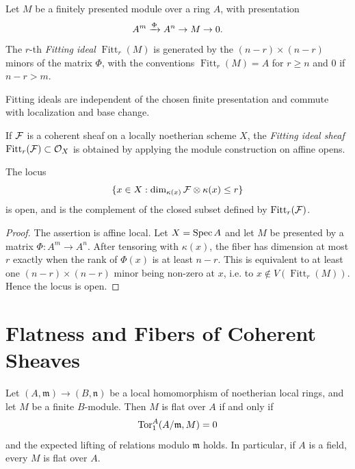 \begin{definition}
Let \(M\) be a finitely presented module over a ring \(A\), with presentation
\[
    A^m\xrightarrow{\Phi} A^n\to M\to0.
\]
The \(r\)-th \emph{Fitting ideal} \(\operatorname{Fitt}_r(M)\) is generated by
the \((n-r)\times(n-r)\) minors of the matrix \(\Phi\), with the conventions
\(\operatorname{Fitt}_r(M)=A\) for \(r\ge n\) and \(0\) if \(n-r>m\).
\end{definition}

\begin{fact}
Fitting ideals are independent of the chosen finite presentation and commute
with localization and base change.
\end{fact}

\begin{definition}
If \(\mathcal{F}\) is a coherent sheaf on a locally noetherian scheme \(X\), the
\emph{Fitting ideal sheaf} \(\operatorname{Fitt}_r(\mathcal{F})\subset\mathcal{O}_X\) is
obtained by applying the module construction on affine opens.
\end{definition}

\begin{proposition}
The locus
\[
    \{x\in X:\dim_{\kappa(x)}\mathcal{F}\otimes\kappa(x)\le r\}
\]
is open, and is the complement of the closed subset defined by
\(\operatorname{Fitt}_r(\mathcal{F})\).
\end{proposition}

\begin{proof}
The assertion is affine local.  Let \(X=\operatorname{Spec} A\) and let \(M\) be presented by
a matrix \(\Phi:A^m\to A^n\).  After tensoring with \(\kappa(x)\), the fiber has
dimension at most \(r\) exactly when the rank of \(\Phi(x)\) is at least
\(n-r\).  This is equivalent to at least one \((n-r)\times(n-r)\) minor being
non-zero at \(x\), i.e. to \(x\notin V(\operatorname{Fitt}_r(M))\).  Hence the
locus is open.
\end{proof}

\section{Flatness and Fibers of Coherent Sheaves}

\begin{fact}
Let \((A,\mathfrak m)\to(B,\mathfrak n)\) be a local homomorphism of
noetherian local rings, and let \(M\) be a finite \(B\)-module.  Then \(M\) is
flat over \(A\) if and only if
\[
    \operatorname{Tor}_1^A(A/\mathfrak m,M)=0
\]
and the expected lifting of relations modulo \(\mathfrak m\) holds.  In
particular, if \(A\) is a field, every \(M\) is flat over \(A\).
\end{fact}


